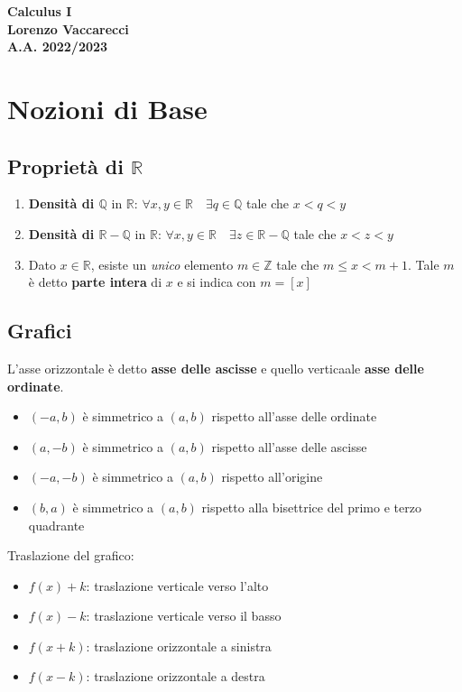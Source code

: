 \documentclass[12pt, a4paper]{report}
\begin{document}
    \begin{titlepage}
        \centering
        \vfill
        {\bfseries\Huge
            Calculus I\\
            \vskip1cm
            \Large
            Lorenzo Vaccarecci\\
            \vskip1cm
            \normalsize
            A.A. 2022/2023
        }
        \vfill
        \vfill
        \vfill
    \end{titlepage}
    \tableofcontents
    \chapter{Nozioni di Base}
    \section{Proprietà di $\mathbb{R}$}
    \begin{enumerate}
        \item \textbf{Densità di $\mathbb{Q} \text{ in } \mathbb{R}$}: $\forall x,y \in \mathbb{R} \quad \exists q \in \mathbb{Q}$ tale che $x<q<y$
        \item \textbf{Densità di $\mathbb{R}-\mathbb{Q} \text{ in } \mathbb{R}$}: $\forall x,y \in \mathbb{R} \quad \exists z \in \mathbb{R}-\mathbb{Q}$ tale che $x<z<y$
        \item Dato $x \in \mathbb{R}$, esiste un \textit{unico} elemento $m \in \mathbb{Z}$ tale che $m \leq x < m+1$. Tale $m$ è detto \textbf{parte intera} di $x$ e si indica con $m=[x]$
    \end{enumerate}
    \section{Grafici}
    L'asse orizzontale è detto \textbf{asse delle ascisse} e quello verticaale \textbf{asse delle ordinate}.
    \begin{itemize}
        \item $(-a,b)$ è simmetrico a $(a,b)$ rispetto all'asse delle ordinate
        \item $(a,-b)$ è simmetrico a $(a,b)$ rispetto all'asse delle ascisse
        \item $(-a,-b)$ è simmetrico a $(a,b)$ rispetto all'origine
        \item $(b,a)$ è simmetrico a $(a,b)$ rispetto alla bisettrice del primo e terzo quadrante
    \end{itemize}
    Traslazione del grafico:
    \begin{itemize}
        \item $f(x)+k$: traslazione verticale verso l'alto
        \item $f(x)-k$: traslazione verticale verso il basso
        \item $f(x+k)$: traslazione orizzontale a sinistra
        \item $f(x-k)$: traslazione orizzontale a destra
    \end{itemize}
\end{document}
